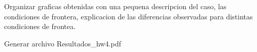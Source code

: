 Organizar graficas obtenidas con una pequena descripcion del caso, las condiciones de frontera, explicacion de las diferencias observadas para distintas condiciones de frontea. 


Generar archivo Resultados_hw4.pdf



